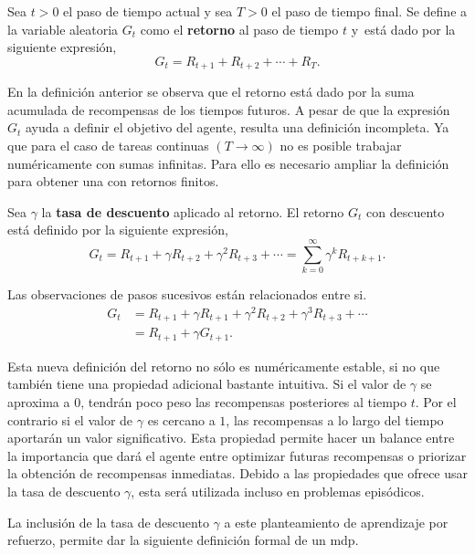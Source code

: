 \begin{definition}
 Sea $t>0$ el paso de tiempo actual y sea $T>0$ el paso de tiempo final. Se define a la variable aleatoria $G_t$ como el \textbf{retorno} al paso de tiempo $t$ y está dado por la siguiente expresión, 
 $$G_t = R_{t+1} + R_{t+2} + \cdots + R_{T}.$$
 \end{definition}
 
 En la definición anterior se observa que el retorno está dado por la suma acumulada de recompensas de los tiempos futuros. A pesar de que la expresión $G_t$ ayuda a definir el objetivo del agente, resulta una definición incompleta. Ya que para el caso de tareas continuas $(T\rightarrow\infty)$ no es posible trabajar numéricamente con sumas infinitas. Para ello es necesario ampliar la definición para obtener una con retornos finitos.

\begin{definition}
 Sea $\gamma$ la \textbf{tasa de descuento} aplicado al retorno. El retorno $G_t$ con descuento está definido por la siguiente expresión, 
 $$ G_{t} = R_{t+1} + \gamma R_{t+2} + \gamma^2 R_{t+3} + \cdots = \sum_{k=0}^{\infty} \gamma^{k} R_{t+k+1}.$$
\end{definition}

\begin{remark}\label{obs:return}
    Las observaciones de pasos sucesivos están relacionados entre si. 
    \begin{align*}
        G_t &= R_{t+1} + \gamma R_{t+1} + \gamma^2 R_{t+2} + \gamma^3 R_{t+3} + \cdots \\
        &= R_{t+1} + \gamma G_{t+1}.
    \end{align*}
\end{remark}
Esta nueva definición del retorno no sólo es numéricamente estable, si no que también tiene una propiedad adicional bastante intuitiva. Si el valor de $\gamma$ se aproxima a $0$, tendrán poco peso las recompensas posteriores al tiempo $t$. Por el contrario si el valor de $\gamma$ es cercano a $1$, las recompensas a lo largo del tiempo 
aportarán un valor significativo. Esta propiedad permite hacer un balance entre la importancia que dará el agente entre optimizar futuras recompensas o priorizar la obtención de recompensas inmediatas. Debido a las propiedades que ofrece usar la tasa de descuento $\gamma$, esta será utilizada incluso en problemas episódicos. \cite{Sutton2018}

La inclusión de la tasa de descuento $\gamma$ a este planteamiento de aprendizaje por refuerzo, permite dar la siguiente definición formal de un \acrshort{mdp}.

